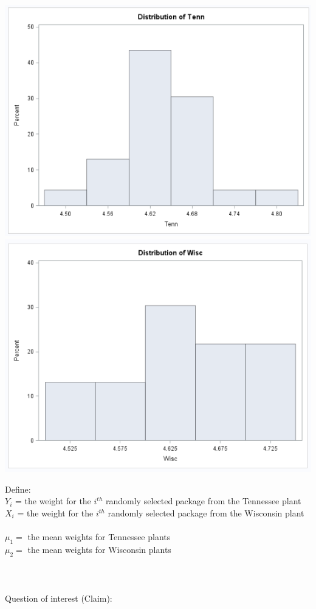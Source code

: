 \begin{center}
\includegraphics[scale=0.35]{catTenn2}\includegraphics[scale=0.35]{catWisc2}
\end{center}
Define:\\
$Y_i$ = the weight for the $i^{th}$ randomly selected package from the Tennessee plant\\
$X_i$ = the weight for the $i^{th}$ randomly selected package from the Wisconsin plant\\~\\
$\mu_{1} =$ the mean weights for Tennessee plants\\
$\mu_{2} = $ the mean weights for Wisconsin plants \\~\\~\\~\\
Question of interest (Claim):\\~\\~\\~\\~\\~\\~\\~\\


